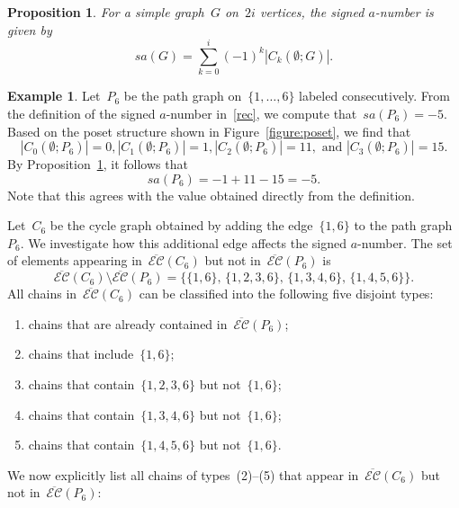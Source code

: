 \documentclass[10pt]{amsart}
\theoremstyle{plain}
\newtheorem{proposition}[theorem]{Proposition}
\numberwithin{equation}{section}
\theoremstyle{definition}
\newtheorem{example}[theorem]{Example}
\newcommand{\EC}{\mathcal{E}\mathcal{C}}
\newcommand{\comp}{\overline{\EC}}
\begin{document}
\begin{proposition}\label{prop:anum}\cite{Choi-Park2015}
    For a simple graph~$G$ on~$2i$ vertices, the signed $a$-number is given by
    $$
    sa(G) = \sum_{k = 0}^{i}(-1)^{k}\left\vert C_{k}(\emptyset;G)\right\vert.
    $$
\end{proposition}

\begin{example}
    Let~$P_6$ be the path graph on~$\{1,\ldots,6\}$ labeled consecutively.
    From the definition of the signed $a$-number in~\eqref{rec}, we compute that~$sa(P_6) = -5$.
    Based on the poset structure shown in Figure~\ref{figure:poset}, we find that
    $$
    |C_0(\emptyset;P_6)| = 0, |C_1(\emptyset;P_6)| = 1, |C_2(\emptyset;P_6)| = 11, \text{ and } |C_3(\emptyset;P_6)| = 15.
    $$
    By Proposition~\ref{prop:anum}, it follows that
    $$
    sa(P_6) = -1+11-15 = -5.
    $$
    Note that this agrees with the value obtained directly from the definition.
\end{example}
Let~$C_6$ be the cycle graph obtained by adding the edge~$\{1,6\}$ to the path graph~$P_6$.
We investigate how this additional edge affects the signed $a$-number.
The set of elements appearing in~$\comp(C_6)$ but not in~$\comp(P_6)$ is
$$
\comp(C_6) \setminus \comp(P_6) = \{\{1,6\},\, \{1,2,3,6\},\, \{1,3,4,6\},\, \{1,4,5,6\}\}.
$$
All chains in~$\comp(C_6)$ can be classified into the following five disjoint types:
\begin{enumerate}
  \item chains that are already contained in~$\comp(P_6)$;
  \item chains that include~$\{1,6\}$;
  \item chains that contain~$\{1,2,3,6\}$ but not~$\{1,6\}$;
  \item chains that contain~$\{1,3,4,6\}$ but not~$\{1,6\}$;
  \item chains that contain~$\{1,4,5,6\}$ but not~$\{1,6\}$.
\end{enumerate}
We now explicitly list all chains of types~(2)–(5) that appear in~$\comp(C_6)$ but not in~$\comp(P_6)$:
\end{document}
